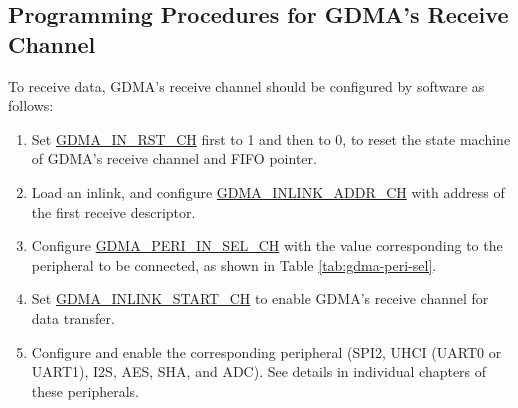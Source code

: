 \documentclass[main\_\_EN.tex]{subfiles}
\begin{document}
\subsection{Programming Procedures for GDMA's Receive Channel}
To receive data, GDMA's receive channel should be configured by software as follows:
\begin{enumerate}
    \item Set \hyperref[fielddesc:GDMAINRSTCHN]{GDMA\_IN\_RST\_CH} first to 1 and then to 0, to reset the state machine of GDMA's receive channel and FIFO pointer.
    \item Load an inlink, and configure \hyperref[fielddesc:GDMAINLINKADDRCHN]{GDMA\_INLINK\_ADDR\_CH} with address of the first receive descriptor.
    \item Configure \hyperref[fielddesc:GDMAPERIINSELCHN]{GDMA\_PERI\_IN\_SEL\_CH} with the value corresponding to the peripheral to be connected, as shown in Table \ref{tab:gdma-peri-sel}.
    \item Set \hyperref[fielddesc:GDMAINLINKSTARTCHN]{GDMA\_INLINK\_START\_CH} to enable GDMA's receive channel for data transfer.
    \item Configure and enable the corresponding peripheral (SPI2, UHCI (UART0 or UART1), I2S, AES, SHA, and ADC). See details in individual chapters of these peripherals.
\end{enumerate}
\end{document}

